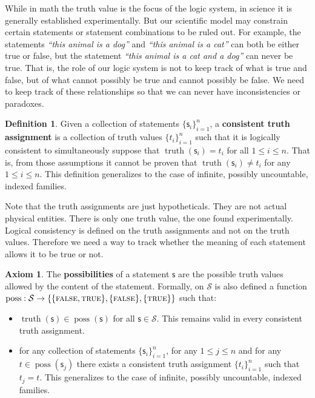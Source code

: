 \documentclass[letterpaper]{article}
\theoremstyle{plain}%
\theoremstyle{definition}
\newtheorem{defn}[thrm]{Definition}
\newtheorem{axiom}[thrm]{Axiom}
\theoremstyle{remark}
\numberwithin{equation}{section}
\DeclareMathOperator{\truth}{truth}
\DeclareMathOperator{\possFn}{poss}
\def\TRUE{\textsc{true}}
\def\FALSE{\textsc{false}}
\newcommand{\stmt}[1][s] {\mathsf{#1}}
\newcommand{\statement}[1] {\emph{``#1''}}
\begin{document}
While in math the truth value is the focus of the logic system, in science it is generally established experimentally. But our scientific model may constrain certain statements or statement combinations to be ruled out. For example, the statements \statement{this animal is a dog} and \statement{this animal is a cat} can both be either true or false, but the statement \statement{this animal is a cat and a dog} can never be true. That is, the role of our logic system is not to keep track of what is true and false, but of what cannot possibly be true and cannot possibly be false. We need to keep track of these relationships so that we can never have inconsistencies or paradoxes.

\begin{defn}
	Given a collection of statements $\{\stmt_i\}^n_{i=1}$, a \textbf{consistent truth assignment} is a collection of truth values $\{t_i\}^n_{i=1}$ such that it is logically consistent to simultaneously suppose that $\truth(\stmt_i) = t_i$ for all $1 \leq i \leq n$. That is, from those assumptions it cannot be proven that $\truth(\stmt_i) \neq t_i$ for any $1 \leq i \leq n$.  This definition generalizes to the case of infinite, possibly uncountable, indexed families.
\end{defn}

Note that the truth assignments are just hypotheticals. They are not actual physical entities. There is only one truth value, the one found experimentally. Logical consistency is defined on the truth assignments and not on the truth values. Therefore we need a way to track whether the meaning of each statement allows it to be true or not.

\begin{axiom}\label{ax_possibilities}
	The \textbf{possibilities} of a statement $\stmt$ are the possible truth values allowed by the content of the statement. Formally, on $\mathcal{S}$ is also defined a function $\possFn: \mathcal{S} \to \{\{\FALSE, \TRUE\},\{\FALSE\},\{\TRUE\}\}$ such that:
	\begin{itemize}
		\item $\truth(\stmt) \in \possFn(\stmt)$ for all $\stmt \in \mathcal{S}$. This remains valid in every consistent truth assignment.
		\item for any collection of statements $\{\stmt_i\}^n_{i=1}$, for any $1 \leq j \leq n$ and for any $t \in \possFn(\stmt_j)$ there exists a consistent truth assignment $\{t_i\}^n_{i=1}$ such that $t_j = t$. This generalizes to the case of infinite, possibly uncountable, indexed families.
	\end{itemize}
\end{axiom}
\end{document}
